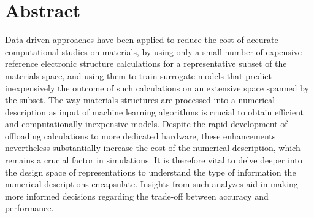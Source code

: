 
\chapter*{Abstract}
Data-driven approaches have been applied to reduce the cost of accurate computational studies on materials, by using only a small number of expensive reference electronic structure calculations for a representative subset of the materials space, and using them to train surrogate models that predict inexpensively the outcome of such calculations on an extensive space spanned by the subset.
The way materials structures are processed into a numerical description as input of machine learning algorithms is crucial to obtain efficient and computationally inexpensive models.
%
Despite the rapid development of offloading calculations to more dedicated hardware, these enhancements nevertheless substantially increase the cost of the numerical description, which remains a crucial factor in simulations.
It is therefore vital to delve deeper into the design space of representations to understand the type of information the numerical descriptions encapsulate.
Insights from such analyzes aid in making more informed decisions regarding the trade-off between accuracy and performance.
